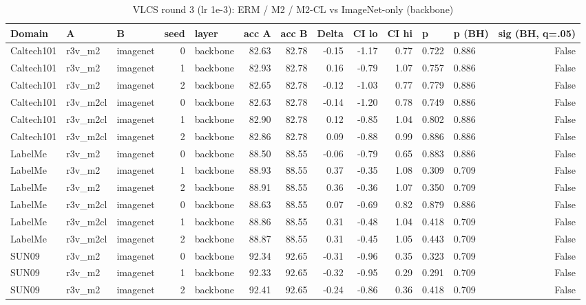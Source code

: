 \begin{table}
\caption{VLCS round 3 (lr 1e-3): ERM / M2 / M2-CL vs ImageNet-only (backbone)}
\label{tab:leak_r3v_vs_imagenet}
\begin{tabular}{lllrlrrrrrllr}
\toprule
Domain & A & B & seed & layer & acc A & acc B & Delta & CI lo & CI hi & p & p (BH) & sig (BH, q=.05) \\
\midrule
Caltech101 & r3v\_m2 & imagenet & 0 & backbone & 82.63 & 82.78 & -0.15 & -1.17 & 0.77 & 0.722 & 0.886 & False \\
Caltech101 & r3v\_m2 & imagenet & 1 & backbone & 82.93 & 82.78 & 0.16 & -0.79 & 1.07 & 0.757 & 0.886 & False \\
Caltech101 & r3v\_m2 & imagenet & 2 & backbone & 82.65 & 82.78 & -0.12 & -1.03 & 0.77 & 0.779 & 0.886 & False \\
Caltech101 & r3v\_m2cl & imagenet & 0 & backbone & 82.63 & 82.78 & -0.14 & -1.20 & 0.78 & 0.749 & 0.886 & False \\
Caltech101 & r3v\_m2cl & imagenet & 1 & backbone & 82.90 & 82.78 & 0.12 & -0.85 & 1.04 & 0.802 & 0.886 & False \\
Caltech101 & r3v\_m2cl & imagenet & 2 & backbone & 82.86 & 82.78 & 0.09 & -0.88 & 0.99 & 0.886 & 0.886 & False \\
LabelMe & r3v\_m2 & imagenet & 0 & backbone & 88.50 & 88.55 & -0.06 & -0.79 & 0.65 & 0.883 & 0.886 & False \\
LabelMe & r3v\_m2 & imagenet & 1 & backbone & 88.93 & 88.55 & 0.37 & -0.35 & 1.08 & 0.309 & 0.709 & False \\
LabelMe & r3v\_m2 & imagenet & 2 & backbone & 88.91 & 88.55 & 0.36 & -0.36 & 1.07 & 0.350 & 0.709 & False \\
LabelMe & r3v\_m2cl & imagenet & 0 & backbone & 88.63 & 88.55 & 0.07 & -0.69 & 0.82 & 0.879 & 0.886 & False \\
LabelMe & r3v\_m2cl & imagenet & 1 & backbone & 88.86 & 88.55 & 0.31 & -0.48 & 1.04 & 0.418 & 0.709 & False \\
LabelMe & r3v\_m2cl & imagenet & 2 & backbone & 88.87 & 88.55 & 0.31 & -0.45 & 1.05 & 0.443 & 0.709 & False \\
SUN09 & r3v\_m2 & imagenet & 0 & backbone & 92.34 & 92.65 & -0.31 & -0.96 & 0.35 & 0.323 & 0.709 & False \\
SUN09 & r3v\_m2 & imagenet & 1 & backbone & 92.33 & 92.65 & -0.32 & -0.95 & 0.29 & 0.291 & 0.709 & False \\
SUN09 & r3v\_m2 & imagenet & 2 & backbone & 92.41 & 92.65 & -0.24 & -0.86 & 0.36 & 0.418 & 0.709 & False \\

\end{tabular}
\end{table}

